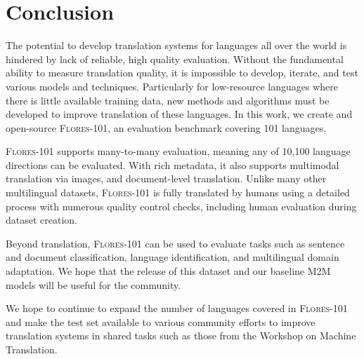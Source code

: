 \section{Conclusion}
\label{sec:conclusion}

The potential to develop translation systems for languages all over the world is hindered by lack of reliable, high quality evaluation. Without the fundamental ability to measure translation quality, it is impossible to develop, iterate, and test various models and techniques. Particularly for low-resource languages where there is little available training data, new methods and algorithms  must be developed to improve translation of these languages. In this work, we create and open-source \textsc{Flores-101}, an evaluation benchmark covering 101 languages. 

\textsc{Flores-101} supports many-to-many evaluation, meaning any of 10,100 language directions can be evaluated. With rich metadata, it also supports multimodal translation via images, and document-level translation. Unlike many other multilingual datasets, \textsc{Flores-101} is fully translated by humans using a detailed process with numerous quality control checks, including human evaluation during dataset creation. 

Beyond translation, \textsc{Flores-101} can be used to evaluate tasks such as sentence and document classification, language identification, and multilingual domain adaptation. We hope that the release of this dataset and our baseline M2M models will be useful for the community. 

We hope to continue to expand the number of languages covered in \textsc{Flores-101} and make the test set available to various community efforts to improve translation systems in shared tasks such as those from the Workshop on Machine Translation. 


